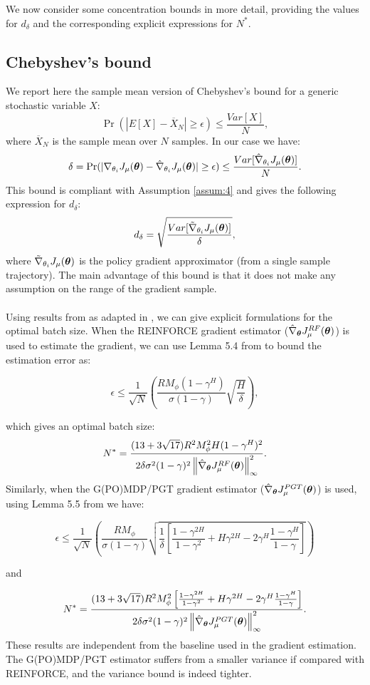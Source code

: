 We now consider some concentration bounds in more detail, providing the values for $d_{\delta}$ and the corresponding explicit expressions for $N^*$.

\subsection{Chebyshev's bound}\label{sec:chebyshev}
We report here the sample mean version of Chebyshev's bound for a generic stochastic variable $X$:
\[
	\Pr(|E[X] - \overline{X}_N| \geq \epsilon) \leq \frac{Var[X]}{N},
\]
where $\overline{X}_N$ is the sample mean over $N$ samples.
In our case we have:
\[
	\delta = \Pr(|\gradJ{\theta_i} - \gradApp{\theta_i}| 
		\geq \epsilon) \leq \frac{Var[\gradApp{\theta_i}]}{N}.
\]
This bound is compliant with Assumption \ref{assum:4} and gives the following expression for $d_\delta$:
\[
d_\delta = \sqrt{\frac{Var[\gradSim{\theta_i}]}{\delta}},
\]
where $\gradSim{\theta_i}$ is the policy gradient approximator (from a single sample trajectory).
The main advantage of this bound is that it does not make any assumption on the range of the gradient sample.
\paragraph{}
Using results from \cite{DBLP:journals/nn/ZhaoHNS12} as adapted in \cite{NIPS2013_5186}, we can give explicit formulations for the optimal batch size.
When the REINFORCE \cite{Williams1992} gradient estimator ($\gradRF{\vtheta}$) is used to estimate the gradient, we can use Lemma 5.4 from \cite{NIPS2013_5186} to bound the estimation error as:

\[
\epsilon \leq \frac{1}{\sqrt{N}}\left(\frac{RM_{\phi}(1-\gamma^H)}
				{\sigma(1-\gamma)}\sqrt{\frac{H}{\delta}}\right),
\]

which gives an optimal batch size:
\[
N^* = \frac{(13+3\sqrt{17})R^2M_{\phi}^2H(1-\gamma^H)^2}
	 		{2\delta\sigma^2(1-\gamma)^2
	 			\norm[\infty]{\gradRF{\vtheta}}^2}.
\]
Similarly, when the G(PO)MDP/PGT gradient estimator ($\gradPGT{\vtheta}$) is used, using Lemma 5.5 from \cite{NIPS2013_5186} we have:

\[
\epsilon \leq \frac{1}{\sqrt{N}}\left(\frac{RM_{\phi}}
				{\sigma(1-\gamma)}\sqrt{\frac{1}{\delta}
				\left[\frac{1-\gamma^{2H}}{1-\gamma^2} + H\gamma^{2H} - 2\gamma^H
				\frac{1-\gamma^H}{1-\gamma}\right]}\right)
\]

and

\[
N^* = \frac{(13+3\sqrt{17})R^2M_{\phi}^2
			\left[\frac{1-\gamma^{2H}}{1-\gamma^2} + H\gamma^{2H} - 2\gamma^H
	 		\frac{1-\gamma^H}{1-\gamma}\right]}
	 		{2\delta\sigma^2(1-\gamma)^2
	 			\norm[\infty]{\gradPGT{\vtheta}}^2}.
\]
These results are independent from the baseline used in the gradient estimation. The G(PO)MDP/PGT estimator suffers from a smaller variance if compared with REINFORCE, and the variance bound is indeed tighter.

